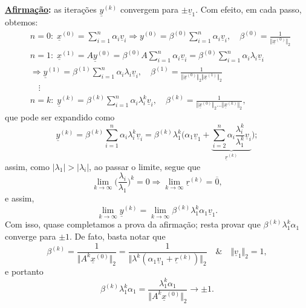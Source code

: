 \documentclass[../numerical_methods.tex]{subfiles}
\begin{document}
\textbf{\underline{Afirmação}:} as iterações \(\underline{y}^{(k)}\) convergem para \(\pm \underline{v}_1\).
Com efeito, em cada passo, obtemos:
\begin{align*}
	 & n=0:\; \underline{x}^{(0)} = \sum\limits_{i=1}^{n}\alpha_{i}\underline{v}_{i} \Rightarrow y^{(0)}=\beta^{(0)}\sum\limits_{i=1}^{n}\alpha_{i}\underline{v}_{i}, \quad \beta^{(0)}=\frac{1}{\Vert \underline{x}^{(0)} \Vert_{2}} \\
	 & n=1:\; \underline{x}^{(1)} = A\underline{y}^{(0)} = \beta^{(0)}A \sum\limits_{i=1}^{n}\alpha_{i}\underline{v}_{i} = \beta^{(0)}\sum\limits_{i=1}^{n}\alpha_{i}\lambda_{i}\underline{v}_{i}                                     \\
	 & \Rightarrow  \underline{y}^{(1)}=\beta^{(1)} \sum\limits_{i=1}^{n}\alpha_{i}\lambda_{i}\underline{v}_{i}, \quad \beta^{(1)}=\frac{1}{\Vert \underline{x}^{(0)} \Vert_{2} \Vert \underline{x}^{(1)} \Vert_{2}}                  \\
	 & \quad \vdots                                                                                                                                                                                                                   \\
	 & n=k:\; \underline{y}^{(k)}=\beta^{(k)}\sum\limits_{i=1}^{n}\alpha_{i}\lambda_{i}^{k}\underline{v}_{i}, \quad \beta^{(k)}=\frac{1}{\Vert \underline{x}^{(0)} \Vert_{2}\dotsc \Vert \underline{x}^{(k)} \Vert_{2}},
\end{align*}
que pode ser expandido como
\[
	\underline{y}^{(k)} = \beta^{(k)}\sum\limits_{i=1}^{n}\alpha_{i}\lambda_{i}^{k}\underline{v}_{i}=\beta^{(k)}\lambda_{1}^{k}\biggl(\alpha_1\underline{v}_1 + \underbrace{\sum\limits_{i=2}^{n}\alpha_{i}\frac{\lambda_{i}^{k}}{\lambda_{1}^{k}}\underline{v}_{i}}_{\underline{r}^{(k)}}\biggr);
\]
assim, como \(| \lambda_1 | > | \lambda_{i} |\), ao passar o limite, segue que
\[
	\lim_{k\to \infty}\biggl(\frac{\lambda_{i}}{\lambda_1}\biggr)^{k} = 0 \Rightarrow \lim_{k\to \infty}\underline{r}^{(k)}=\overline{0},
\]
e assim,
\[
	\lim_{k\to \infty}\underline{y}^{(k)}=\lim_{k\to \infty}\beta^{(k)}\lambda_{1}^{k}\alpha_1 \underline{v}_1.
\]
Com isso, quase completamos a prova da afirmação; resta provar que \(\beta^{(k)}\lambda_{1}^{k}\alpha_1\) converge para \(\pm 1\). De fato, basta notar que
\[
	\beta^{(k)} = \frac{1}{\Vert A^{k}\underline{x}^{(0)} \Vert_{2}}=\frac{1}{\Vert \lambda^{k}(\alpha_1\underline{v}_1 + \underline{r}^{(k)}) \Vert_{2}} \quad\&\quad \Vert \underline{v}_1 \Vert_{2} = 1,
\]
e portanto
\[
	\beta^{(k)}\lambda_{1}^{k}\alpha_1=\frac{\lambda_1^{k}\alpha_1}{\Vert A^{k}\underline{x}^{(0)} \Vert_{2}}\to \pm 1.
\]
\end{document}
